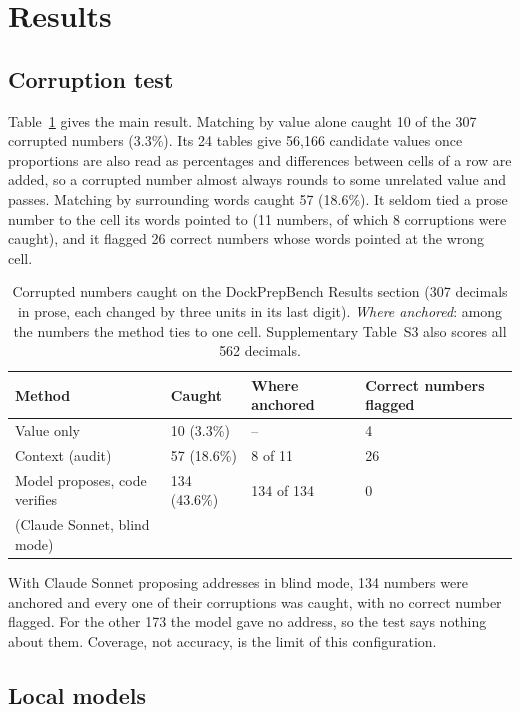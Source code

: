 \section{Results}
\label{sec:results}

\subsection{Corruption test}

Table~\ref{tab:corruption} gives the main result. Matching by value alone caught 10 of the 307
corrupted numbers (3.3\%). Its 24 tables give 56,166 candidate values once proportions are also
read as percentages and differences between cells of a row are added, so a corrupted number
almost always rounds to some unrelated value and passes. Matching by surrounding words caught 57
(18.6\%). It seldom tied a prose number to the cell its words pointed to (11 numbers, of which 8
corruptions were caught), and it flagged 26 correct numbers whose words pointed at the wrong
cell.

\begin{table}[t]
\centering
\caption{Corrupted numbers caught on the DockPrepBench Results section (307 decimals in prose,
each changed by three units in its last digit). \emph{Where anchored}: among the numbers the
method ties to one cell. Supplementary Table~S3 also scores all 562 decimals.}
\label{tab:corruption}
\begin{tabular}{llll}
\toprule
Method & Caught & Where anchored & Correct numbers flagged \\
\midrule
Value only & 10 (3.3\%) & -- & 4 \\
Context (audit) & 57 (18.6\%) & 8 of 11 & 26 \\
Model proposes, code verifies & 134 (43.6\%) & 134 of 134 & 0 \\
\quad (Claude Sonnet, blind mode) & & & \\
\bottomrule
\end{tabular}
\end{table}

With Claude Sonnet proposing addresses in blind mode, 134 numbers were anchored and every one of
their corruptions was caught, with no correct number flagged. For the other 173 the model gave
no address, so the test says nothing about them. Coverage, not accuracy, is the limit of this
configuration.

\subsection{Local models}

